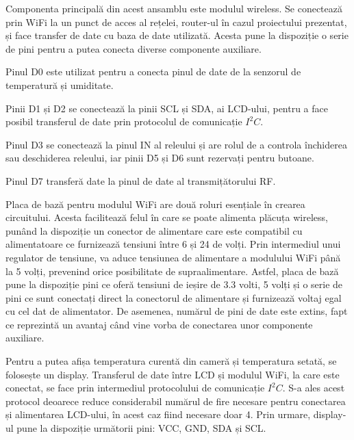 	Componenta principală din acest ansamblu este modulul wireless. Se conectează prin WiFi la un punct de acces al rețelei, router-ul în cazul proiectului prezentat, și face transfer de date cu baza de date utilizată. Acesta pune la dispoziție o serie de pini pentru a putea conecta diverse componente auxiliare. 
	
	Pinul D0 este utilizat pentru a conecta pinul de date de la senzorul de temperatură și umiditate.

	Pinii D1 și D2 se conectează la pinii SCL și SDA, ai LCD-ului, pentru a face posibil transferul de date prin protocolul de comunicație $I^2C$.

	Pinul D3 se conectează la pinul IN al releului și are rolul de a controla închiderea sau deschiderea releului, iar pinii D5 și D6 sunt rezervați pentru butoane. 

	Pinul D7 transferă date la pinul de date al transmițătorului RF. 

\vspace{1em}

	Placa de bază pentru modulul WiFi are două roluri esențiale în crearea circuitului. Acesta facilitează felul în care se poate alimenta plăcuța wireless, punând la dispoziție un conector de alimentare care este compatibil cu alimentatoare ce furnizează tensiuni între 6 și 24 de volți. Prin intermediul unui regulator de tensiune, va aduce tensiunea de alimentare a modulului WiFi până la 5 volți, prevenind orice posibilitate de supraalimentare. Astfel, placa de bază pune la dispoziție pini ce oferă tensiuni de ieșire de 3.3 volti, 5 volți și o serie de pini ce sunt conectați direct la conectorul de alimentare și furnizează voltaj egal cu cel dat de alimentator. De asemenea, numărul de pini de date este extins, fapt ce reprezintă un avantaj când vine vorba de conectarea unor componente auxiliare.

\vspace{1em}

	Pentru a putea afișa temperatura curentă din cameră și temperatura setată, se folosește un display. Transferul de date între LCD și modulul WiFi, la care este conectat, se face prin intermediul protocolului de comunicație $I^2C$. S-a ales acest protocol deoarece reduce considerabil numărul de fire necesare pentru conectarea și alimentarea LCD-ului, în acest caz fiind necesare doar 4. Prin urmare, display-ul pune la dispoziție următorii pini:  VCC, GND, SDA și SCL.

\vspace{1em}

